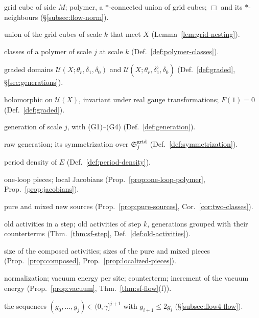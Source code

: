 {\small
\begin{description}[font=\normalfont,style=nextline,leftmargin=10em,labelwidth=9.5em,labelsep=0.5em,itemsep=1pt,parsep=0pt,topsep=4pt]
\item[$\Box$, $X$, $\Box^+$] grid cube of side $M$; polymer, a $*$-connected union of grid cubes; $\Box$ and its $*$-neighbours (\S\ref{subsec:flow-norm}).
\item[$\operatorname{cl}_kX$] union of the grid cubes of scale $k$ that meet $X$ (Lemma~\ref{lem:grid-nesting}).
\item[small, recent, large, wrapping] classes of a polymer of scale $j$ at scale $k$ (Def.~\ref{def:polymer-classes}).
\item[$\mathcal U(X)$, $\mathcal U^\flat(X)$] graded domains $\mathcal U(X;\theta_r,\delta_1,\delta_0)$ and $\mathcal U(X;\theta_r,\delta^\flat_1,\delta_0)$ (Def.~\ref{def:graded}, \S\ref{sec:generations}).
\item[graded activity, normalized] holomorphic on $\mathcal U(X)$, invariant under real gauge transformations; $F(1)=0$ (Def.~\ref{def:graded}).
\item[$E^{(j)}$] generation of scale $j$, with (G1)--(G4) (Def.~\ref{def:generation}).
\item[$E'$, $E'^{\rm sym}$] raw generation; its symmetrization over $\mathfrak S^{\rm grid}_j$ (Def.~\ref{def:symmetrization}).
\item[$\bar T_E$] period density of $E$ (Def.~\ref{def:period-density}).
\item[$\mathfrak e(X)$, $\mathfrak j_c$] one-loop pieces; local Jacobians (Prop.~\ref{prop:one-loop-polymer}, Prop.~\ref{prop:jacobians}).
\item[$E^\#_{\rm p}$, $E^\#_{\rm m}$] pure and mixed new sources (Prop.~\ref{prop:pure-sources}, Cor.~\ref{cor:two-classes}).
\item[$\mathfrak E$, $\mathcal E_k$] old activities in a step; old activities of step $k$, generations grouped with their counterterms (Thm.~\ref{thm:sf-step}, Def.~\ref{def:old-activities}).
\item[$\tau$, $\epsilon_{\rm p}$, $\epsilon_{\rm m}$] size of the composed activities; sizes of the pure and mixed pieces (Prop.~\ref{prop:composed}, Prop.~\ref{prop:localized-pieces}).
\item[$\mathcal Z_k$, $\eps_k$, $E_0$, $\delta_k$] normalization; vacuum energy per site; counterterm; increment of the vacuum energy (Prop.~\ref{prop:vacuum}, Thm.~\ref{thm:sf-flow}(f)).
\item[$\Sigma_j$] the sequences $(g_0,\dots,g_j)\in(0,\gamma]^{j+1}$ with $g_{i+1}\le2g_i$ (\S\ref{subsec:flow4-flow}).
\end{description}}

